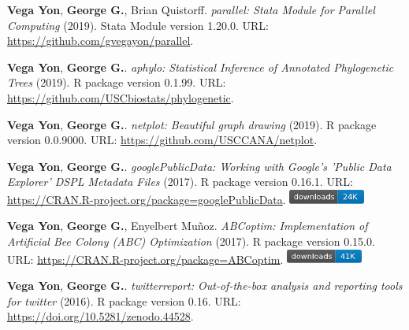 \item {\bfseries Vega Yon}, {\bfseries George G.}, Brian Quistorff. \textit{parallel: Stata Module for Parallel Computing} (2019). Stata Module version 1.20.0. {\small URL}: \url{https://github.com/gvegayon/parallel}.  
\item {\bfseries Vega Yon}, {\bfseries George G.}. \textit{aphylo: Statistical Inference of Annotated Phylogenetic Trees} (2019). R package version 0.1.99. {\small URL}: \url{https://github.com/USCbiostats/phylogenetic}.  
\item {\bfseries Vega Yon}, {\bfseries George G.}. \textit{netplot: Beautiful graph drawing} (2019). R package version 0.0.9000. {\small URL}: \url{https://github.com/USCCANA/netplot}.  
\item {\bfseries Vega Yon}, {\bfseries George G.}. \textit{googlePublicData: Working with Google's 'Public Data Explorer' DSPL Metadata Files} (2017). R package version 0.16.1. {\small URL}: \url{https://CRAN.R-project.org/package=googlePublicData}. \includegraphics[width=2.5cm]{fig/cran-downloads-googlepublicdata.pdf} 
\item {\bfseries Vega Yon}, {\bfseries George G.}, Enyelbert Muñoz. \textit{ABCoptim: Implementation of Artificial Bee Colony (ABC) Optimization} (2017). R package version 0.15.0. {\small URL}: \url{https://CRAN.R-project.org/package=ABCoptim}. \includegraphics[width=2.5cm]{fig/cran-downloads-abcoptim.pdf} 
\item {\bfseries Vega Yon}, {\bfseries George G.}. \textit{{twitterreport: Out-of-the-box analysis and 
	reporting tools for twitter}} (2016). R package version 0.16. {\small URL}: \url{https://doi.org/10.5281/zenodo.44528}.  
